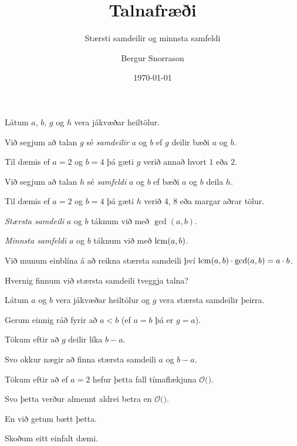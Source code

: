 \title{Talnafræði}
\subtitle{Stærsti samdeilir og minnsta samfeldi}
\author{Bergur Snorrason}
\date{\today}



\frame{\titlepage}

{
	{
		\item<1-> Látum $a$, $b$, $g$ og $h$ vera jákvæðar heiltölur.
		\item<2-> Við segjum að talan $g$ sé \emph{samdeilir} $a$ og $b$ ef $g$ deilir bæði $a$ og $b$.
		\item<3-> Til dæmis ef $a = 2$ og $b = 4$ þá gæti $g$ verið annað hvort $1$ eða $2$.
		\item<4-> Við segjum að talan $h$ sé \emph{samfeldi} $a$ og $b$ ef bæði $a$ og $b$ deila $h$.
		\item<5-> Til dæmis ef $a = 2$ og $b = 4$ þá gæti $h$ verið $4$, $8$ eða margar aðrar tölur.
		\item<6-> \emph{Stærsta samdeili} $a$ og $b$ táknum við með $\gcd(a, b)$.
		\item<7-> \emph{Minnsta samfeldi} $a$ og $b$ táknum við með $\operatorname{lcm}(a, b)$.
		\item<8-> Við munum einblína á að reikna stærsta samdeili því $\operatorname{lcm}(a, b) \cdot \gcd(a, b) = a \cdot b$.
	}
}

{
	{
		\item<1-> Hvernig finnum við stærsta samdeili tveggja talna?
		\item<2-> Látum $a$ og $b$ vera jákvæðar heiltölur og $g$ vera stærsta samdeilir þeirra.
		\item<3-> Gerum einnig ráð fyrir að $a < b$ (ef $a = b$ þá er $g = a$).
		\item<4-> Tökum eftir að $g$ deilir líka $b - a$.
		\item<5-> Svo okkur nægir að finna stærsta samdeili $a$ og $b - a$.
		\item<6->[] 
	}
}

{
	{
		\item<1-> Tökum eftir að ef $a = 2$ hefur þetta fall tímaflækjuna $\mathcal{O}($\onslide<2->{$\,b\,$}$)$.
		\item<3-> Svo þetta verður almennt aldrei betra en $\mathcal{O}($\onslide<4->{$\max(a, b)$}$)$.
		\item<5-> En við getum bætt þetta.
		\item<6-> Skoðum eitt einfalt dæmi.
	}
}

